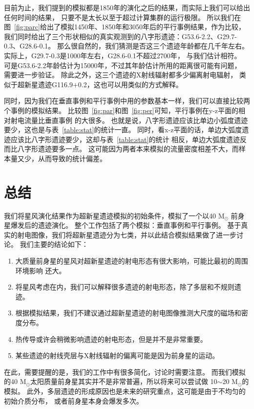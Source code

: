 目前为止，我们提到的模拟都是1850年的演化之后的结果，而实际上我们可以给出任何时间的结果，
只要不是太长以至于超过计算集群的运行极限。
所以我们在图~\ref{fig:parc}给出了模拟1450年、1850年和3050年后的平行事例结果，作为比较，
我们同时给出了三个形状相似的真实观测到的八字形遗迹：G53.6-2.2、G29.7-0.3、G28.6-0.1。
那么很自然的，我们猜测是否这三个遗迹年龄都在几千年左右。
实际上，G29.7-0.3是1000年左右\citep{Leahy2008}，G28.6-0.1不超过2700年\citep{Bamba2001}，
与我们估计相符。
可是G53.6-2.2年龄估计为15000年\citet{Long1991}，不过其年龄估计所用的距离很可能有问题，
需要进一步验证。
除此之外，这三个遗迹的X射线辐射都多少偏离射电辐射\citep{Broersen2015,Su2009,Bamba2001}，
类似于超新星遗迹G116.9+0.2，这也可以用类似的方式解释。

同时，因为我们在垂直事例和平行事例中用的参数基本一样，我们可以直接比较两个事例的模拟结果。
比较图~\ref{fig:par}和图~\ref{fig:per}可知，平行事例在y-z平面的相对射电流量比垂直事例
的大很多。
也就是说，八字形遗迹应该比单边小弧度遗迹要少，这也是与表~\ref{table:stat}的统计一直。
同时，看x-z平面的话，单边大弧度遗迹应该比八字形遗迹要少，这却与表~\ref{table:stat}的统计
相反，单边大弧度遗迹反而比八字形遗迹要多一点。
这可能因为两者本来模拟的流量密度相差不大，而样本量又少，从而导致的统计偏差。

\section{总结}
\label{SWsum}
我们将星风演化结果作为超新星遗迹模拟的初始条件，模拟了一个以40  M$_{\odot}$
前身星爆发后的遗迹演化。
整个工作包括了两个模拟：垂直事例和平行事例。
基于真实的射电图像，我们将超新星遗迹分为七类，并以此结合模拟结果做了进一步讨论。
我们主要的结论如下：

\begin{enumerate}

    \item 大质量前身星的星风对超新星遗迹的射电形态有很大影响，可能比最初的周围环境影响
    还大。

    \item 将星风考虑在内，我们可以解释很多遗迹的射电形态，除了多层和不规则遗迹。

    \item 根据模拟结果，我们不建议通过超新星遗迹的射电图像推测大尺度的磁场和密度分布。

    \item 热传导或许会稍微影响遗迹的射电形态，但是并不是非常重要。

    \item 某些遗迹的射线壳层与X射线辐射的偏离可能是因为前身星的运动。

\end{enumerate}

在此，需要提醒的是，我们的工作中有很多简化，讨论时需要注意。
而我们模拟的40 M$_{\odot}$太阳质量前身星其实并不是非常普遍，所以将来可以尝试做
10$\sim$20 M$_{\odot}$的模拟。
此外，多层遗迹的形成原因也是未来的研究重点，这可能是由于不均匀的初始介质分布，
或者前身星本身会爆发多次。
